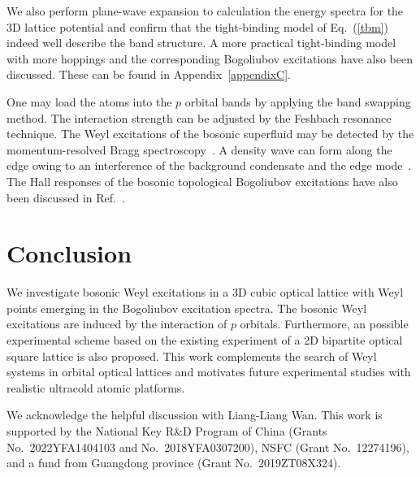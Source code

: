 \documentclass[aps,pra,floatfix,twocolumn,superscriptaddress]{revtex4-1}
\begin{document}
We also perform plane-wave expansion to calculation the energy spectra for the 3D lattice potential and confirm that the tight-binding model of Eq.~(\ref{tbm}) indeed well describe the band structure. A more practical tight-binding model with more hoppings and the corresponding Bogoliubov excitations have also been discussed. These can be found in Appendix~\ref{appendixC}. 

One may load the atoms into the $p$ orbital bands by applying the band swapping method. The interaction strength can be adjusted by the Feshbach resonance technique. The Weyl excitations of the bosonic superfluid may be detected by the momentum-resolved Bragg spectroscopy~\cite{Ernst2010}. A density wave can form along the edge owing to an interference of the background condensate and the edge mode~\cite{Furukawa_2015}. The Hall responses of the bosonic topological Bogoliubov excitations have also been discussed in Ref.~\cite{PhysRevLett.129.185301}.

\section{Conclusion}
\label{Conclusion}
We investigate bosonic Weyl excitations in a 3D cubic optical lattice with Weyl points emerging in the Bogoliubov excitation spectra. The bosonic Weyl excitations are induced by the interaction of $p$ orbitals. Furthermore, an possible experimental scheme based on the existing experiment of a 2D bipartite optical square lattice is also proposed. This work complements the search of Weyl systems in orbital optical lattices and motivates future experimental studies with realistic ultracold atomic platforms.

\begin{acknowledgments}
We acknowledge the helpful discussion with Liang-Liang Wan. This work is supported by the National Key R\&D Program of China (Grants No.~2022YFA1404103 and No.~2018YFA0307200),  NSFC (Grant No.~12274196), and a fund from Guangdong province (Grant No.~2019ZT08X324).
\end{acknowledgments}

\appendix
\end{document}
